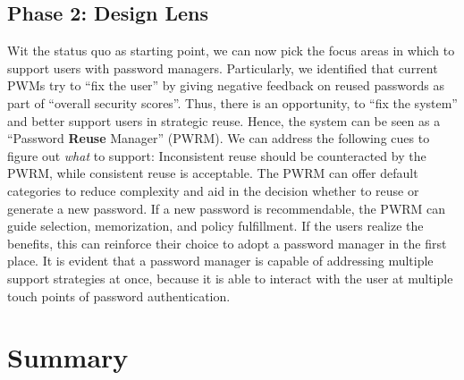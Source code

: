 \subsection{Phase 2: Design Lens}
Wit the status quo as starting point, we can now pick the focus areas in which to support users with password managers. Particularly, we identified that current PWMs try to ``fix the user'' by giving negative feedback on reused passwords as part of ``overall security scores''. Thus, there is an opportunity, to ``fix the system'' and better support users in strategic reuse. Hence, the system can be seen as a ``Password \textbf{Reuse} Manager'' (PWRM). We can address the following cues to figure out \textit{what} to support: Inconsistent reuse should be counteracted by the PWRM, while consistent reuse is acceptable. The PWRM can offer default categories to reduce complexity and aid in the decision whether to reuse or generate a new password. If a new password is recommendable, the PWRM can guide selection, memorization, and policy fulfillment. If the users realize the benefits, this can reinforce their choice to adopt a password manager in the first place. It is evident that a password manager is capable of addressing multiple support strategies at once, because it is able to interact with the user at multiple touch points of password authentication. 




\section{Summary}



\vspace*{1cm}
\noindent
{}

